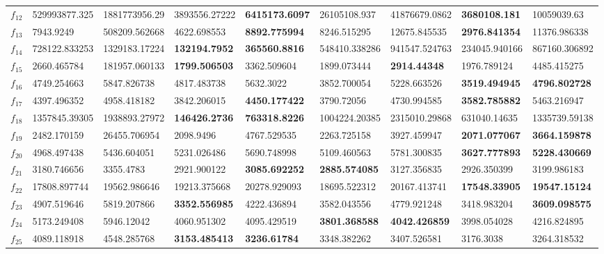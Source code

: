 \begin{table*}[h!]
\begin{tabular}{|p{0.8cm}|p{1.6cm}|p{1.6cm}|p{1.6cm}|p{1.6cm}|p{1.6cm}|p{1.6cm}|p{1.6cm}|p{1.6cm}|}
$f_{12}$  & 529993877.325 & 1881773956.29 & 3893556.27222 & \textbf{6415173.6097} & 26105108.937 & 41876679.0862 & \textbf{3680108.181} & 10059039.63 \\ 
$f_{13}$  & 7943.9249 & 508209.562668 & 4622.698553 & \textbf{8892.775994} & 8246.515295 & 12675.845535 & \textbf{2976.841354} & 11376.986338 \\ 
$f_{14}$  & 728122.833253 & 1329183.17224 & \textbf{132194.7952} & \textbf{365560.8816} & 548410.338286 & 941547.524763 & 234045.940166 & 867160.306892 \\ 
$f_{15}$  & 2660.465784 & 181957.060133 & \textbf{1799.506503} & 3362.509604 & 1899.073444 & \textbf{2914.44348} & 1976.789124 & 4485.415275 \\ 
$f_{16}$  & 4749.254663 & 5847.826738 & 4817.483738 & 5632.3022 & 3852.700054 & 5228.663526 & \textbf{3519.494945} & \textbf{4796.802728} \\ 
$f_{17}$  & 4397.496352 & 4958.418182 & 3842.206015 & \textbf{4450.177422} & 3790.72056 & 4730.994585 & \textbf{3582.785882} & 5463.216947 \\ 
$f_{18}$  & 1357845.39305 & 1938893.27972 & \textbf{146426.2736} & \textbf{763318.8226} & 1004224.20385 & 2315010.29868 & 631040.14635 & 1335739.59138 \\ 
$f_{19}$  & 2482.170159 & 26455.706954 & 2098.9496 & 4767.529535 & 2263.725158 & 3927.459947 & \textbf{2071.077067} & \textbf{3664.159878} \\ 
$f_{20}$  & 4968.497438 & 5436.604051 & 5231.026486 & 5690.748998 & 5109.460563 & 5781.300835 & \textbf{3627.777893} & \textbf{5228.430669} \\ 
$f_{21}$  & 3180.746656 & 3355.4783 & 2921.900122 & \textbf{3085.692252} & \textbf{2885.574085} & 3127.356835 & 2926.350399 & 3199.986183 \\ 
$f_{22}$  & 17808.897744 & 19562.986646 & 19213.375668 & 20278.929093 & 18695.522312 & 20167.413741 & \textbf{17548.33905} & \textbf{19547.15124} \\ 
$f_{23}$  & 4907.519646 & 5819.207866 & \textbf{3352.556985} & 4222.436894 & 3582.043556 & 4779.921248 & 3418.983204 & \textbf{3609.098575} \\ 
$f_{24}$  & 5173.249408 & 5946.12042 & 4060.951302 & 4095.429519 & \textbf{3801.368588} & \textbf{4042.426859} & 3998.054028 & 4216.824895 \\ 
$f_{25}$  & 4089.118918 & 4548.285768 & \textbf{3153.485413} & \textbf{3236.61784} & 3348.382262 & 3407.526581 & 3176.3038 & 3264.318532 \\ 

\end{tabular}
\end{table*}
